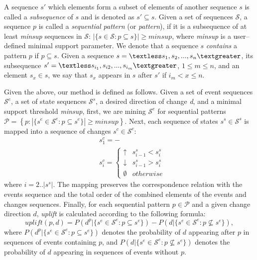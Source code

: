 \documentclass[runningheads,a4paper]{llncs}
\begin{document}
A sequence $s'$ which elements form a subset of elements of another sequence $s$ is called a \textit{subsequence} of $s$ and is denoted as $s'\subseteq s$.
Given a set of sequences $\mathcal{S}$, a sequence $p$ is called a \textit{sequential pattern} (or \textit{pattern}), if it is a subsequence of at least \textit{minsup} sequences in $\mathcal{S}$: $|\{s\in\mathcal{S}:p\subseteq s\}|\geq\textit{minsup}$, where \textit{minsup} is a user--defined minimal support parameter.
We denote that a sequence $s$ \textit{contains} a pattern $p$ if $p\subseteq s$.
Given a sequence $s=\textless s_1,s_2,...,s_n\textgreater$, its subsequence $s'=\textless s_{i_1}, s_{i2}, ..., s_{i_m}\textgreater$, $1\leq m\leq n$, and an element $s_x\in s$, we say that $s_x$ appears in $s$ after $s'$ if $i_m<x\leq n$.

Given the above, our method is defined as follows.
Given a set of event sequences $\mathcal{S}^e$, a set of state sequences $\mathcal{S}^s$, a desired direction of change \textit{d}, and a minimal support threshold \textit{minsup}, first, we are mining $\mathcal{S}^e$ for sequential patterns $\mathcal{P}=\left\{p:|\{s^e\in\mathcal{S}^e:p\subseteq s^e\}|\geq\textit{minsup}\right\}$.
Next, each sequence of states $s^s\in\mathcal{S}^s$ is mapped into a sequence of changes $s^c\in\mathcal{S}^c$:
\begin{equation*}
\begin{split}
&s^c_1=-\\
&s^c_i=\begin{cases}
	\uparrow & s^s_{i-1}<s^s_i \\
	\downarrow & s^s_{i-1}>s^s_i \\
	\emptyset & otherwise
\end{cases}
\end{split}
\end{equation*}
where $i=2..|s^s|$.
The mapping preserves the correspondence relation with the events sequence and the total order of the combined elements of the events and changes sequences.
Finally, for each sequential pattern $p\in\mathcal{P}$ and a given change direction $d$, \textit{uplift} is calculated according to the following formula:
\begin{equation*}
\textit{uplift}(p,d)=P(d^p|\{s^e\in\mathcal{S}^e:p\subseteq s^e\})-P(d|\{s^e\in\mathcal{S}^e:p\not\subseteq s^e\}),
\end{equation*}
where $P(d^p|\{s^e\in\mathcal{S}^e:p\subseteq s^e\})$ denotes the probability of $d$ appearing after $p$ in sequences of events containing $p$, and $P(d|\{s^e\in\mathcal{S}^e:p\not\subseteq s^e\})$ denotes the probability of $d$ appearing in sequences of events without $p$.
\end{document}
